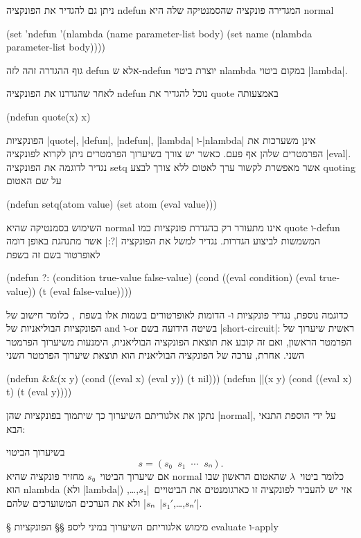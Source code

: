 ניתן גם להגדיר את הפונקציה ndefun המגדירה פונקציה שהסמנטיקה שלה היא normal
\begin{LIBRARY}
(set 'ndefun
  '(nlambda (name parameter-list body)
    (set name (nlambda parameter-list body))))
\end{LIBRARY}
גוף ההגדרה זהה לזה defun אלא ש-ndefun יוצרת ביטוי nlambda במקום ביטוי
\E|lambda|.

לאחר שהגדרנו את הפונקציה ndefun נוכל להגדיר את quote באמצעותה
\begin{LISP}
(ndefun quote(x) x)
\end{LISP}
הפונקציות \E|quote|, \E|defun|, \E|ndefun|, \E|lambda| ו-\E|nlambda| אינן
משערכות את הפרמטרים שלהן אף פעם. כאשר יש צורך בשיערוך הפרמטרים ניתן לקרוא
לפונקציה \E|eval|. נגדיר לדוגמה את הפונקציה setq אשר מאפשרת לקשור ערך לאטום ללא
צורך לבצע quoting על שם האטום
\begin{LISP}
(ndefun setq(atom value)
  (set atom (eval value)))
\end{LISP}
השימוש בסמנטיקה שהיא normal אינו מתעורר רק בהגדרת פונקציות כמו quote ו-defun
המשמשות לביצוע הגדרות. נגדיר למשל את הפונקציה \T|?:| אשר מתנהגת באופן דומה
לאופרטור בשם זה בשפת~\CPL
\begin{LISP}
(ndefun ?: (condition true-value false-value)
  (cond ((eval condition) (eval true-value))
        (t (eval false-value))))
\end{LISP}
כדוגמה נוספת, נגדיר פונקציות \lisp{||} ו-\lisp{&&} הדומות לאופרטורים בשמות אלו
בשפת~\CPL, כלומר חישוב של הפונקציות הבוליאניות של and ו-or בשיטה הידועה בשם
\E|short-circuit|: ראשית שיערוך של הפרמטר הראשון, ואם זה קובע את תוצאת הפונקציה
הבוליאנית, הימנעות משיערוך הפרמטר השני. אחרת, ערכה של הפונקציה הבוליאנית הוא תוצאת
שיערוך הפרמטר השני
\begin{LISP}
(ndefun &&(x y)
  (cond ((eval x) (eval y))
        (t nil)))
(ndefun ||(x y)
  (cond ((eval x) t)
        (t (eval y))))
\end{LISP}

נתקן את אלגוריתם השיערוך כך שיתמוך בפונקציות שהן \E|normal|, על ידי הוספת התנאי
הבא:
\begin{mdframed}[backgroundcolor=Lavender!20]
  בשיערוך הביטוי \[
    s=(s₀\;\;s₁\;\;⋯\;\;sₙ).
  \] אם שיערוך הביטוי~$s₀$ מחזיר פונקציה שהיא
  normal כלומר ביטוי~$λ$ שהאטום הראשון שבו הוא nlambda (ולא \E|lambda|) אזי יש
  להעביר לפונקציה זו כארגומנטים את הביטויים~\E|$s₁$,…,$sₙ$| ולא את הערכים
  המשוערכים שלהם~\E|$s₁'$,…,$sₙ'$|.
\end{mdframed}

§ מימוש אלגוריתם השיערוך במיני ליספ
§§ הפונקציות evaluate ו-apply

